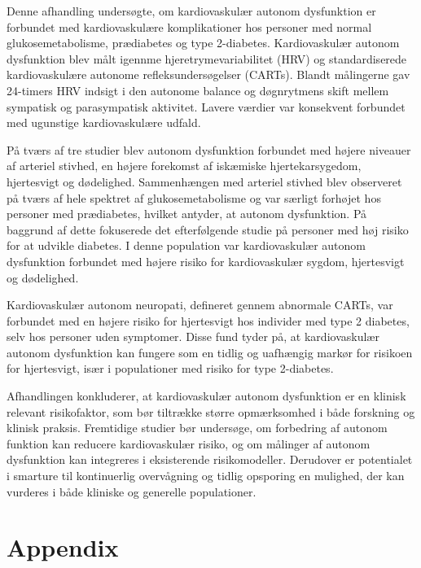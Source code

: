 \documentclass[
  letterpaper,
  headsepline=true,
  open=any]{scrbook}
\begin{document}

Denne afhandling undersøgte, om kardiovaskulær autonom dysfunktion er
forbundet med kardiovaskulære komplikationer hos personer med normal
glukosemetabolisme, prædiabetes og type 2-diabetes. Kardiovaskulær
autonom dysfunktion blev målt igennme hjeretrymevariabilitet (HRV) og
standardiserede kardiovaskulære autonome refleksundersøgelser (CARTs).
Blandt målingerne gav 24-timers HRV indsigt i den autonome balance og
døgnrytmens skift mellem sympatisk og parasympatisk aktivitet. Lavere
værdier var konsekvent forbundet med ugunstige kardiovaskulære udfald.

På tværs af tre studier blev autonom dysfunktion forbundet med højere
niveauer af arteriel stivhed, en højere forekomst af iskæmiske
hjertekarsygedom, hjertesvigt og dødelighed. Sammenhængen med arteriel
stivhed blev observeret på tværs af hele spektret af glukosemetabolisme
og var særligt forhøjet hos personer med prædiabetes, hvilket antyder,
at autonom dysfunktion. På baggrund af dette fokuserede det
efterfølgende studie på personer med høj risiko for at udvikle diabetes.
I denne population var kardiovaskulær autonom dysfunktion forbundet med
højere risiko for kardiovaskulær sygdom, hjertesvigt og dødelighed.

Kardiovaskulær autonom neuropati, defineret gennem abnormale CARTs, var
forbundet med en højere risiko for hjertesvigt hos individer med type 2
diabetes, selv hos personer uden symptomer. Disse fund tyder på, at
kardiovaskulær autonom dysfunktion kan fungere som en tidlig og
uafhængig markør for risikoen for hjertesvigt, især i populationer med
risiko for type 2-diabetes.

Afhandlingen konkluderer, at kardiovaskulær autonom dysfunktion er en
klinisk relevant risikofaktor, som bør tiltrække større opmærksomhed i
både forskning og klinisk praksis. Fremtidige studier bør undersøge, om
forbedring af autonom funktion kan reducere kardiovaskulær risiko, og om
målinger af autonom dysfunktion kan integreres i eksisterende
risikomodeller. Derudover er potentialet i smarture til kontinuerlig
overvågning og tidlig opsporing en mulighed, der kan vurderes i både
kliniske og generelle populationer.

\cleardoublepage
{}
{}
\appendix

\hypertarget{sec-more-results}{%
\chapter{Appendix}\label{sec-more-results}}
\end{document}
